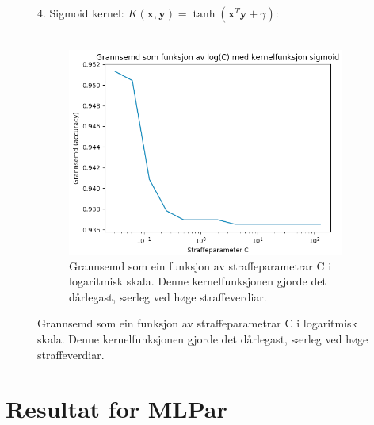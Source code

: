 \documentclass[oneside, nynorsk]{book}
\begin{document}
\begin{figure}[h!]
  4. Sigmoid kernel: $K(\boldsymbol{x},\boldsymbol{y})=\tanh{(\boldsymbol{x}^T\boldsymbol{y}+\gamma)}$: \\\\
  \begin{subfigure}{\textwidth}
        \centering
        \centerline{\includegraphics[width=0.8\linewidth]{sigmoid}}
        \caption{Grannsemd som ein funksjon av straffeparametrar C i logaritmisk skala. Denne kernelfunksjonen gjorde det dårlegast, særleg ved høge straffeverdiar.}
        \label{sigmoid}
    \end{subfigure}
\end{figure}

\section{Resultat for MLPar}
\end{document}
